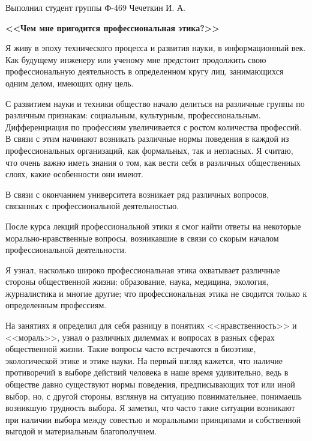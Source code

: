\documentclass[14pt,pscyr]{hedwork}
\begin{document}
  \onehalfspacing

  \begin{flushright}
    Выполнил студент группы Ф-469 Чечеткин И. А.
  \end{flushright}
  \vspace{-2em}
  \begin{center}
    \bfseries <<Чем мне пригодится профессиональная этика?>>
  \end{center}
  
  Я живу в эпоху технического процесса и развития науки, в информационный век.
  Как будущему инженеру или ученому мне предстоит продолжить свою
  профессиональную деятельность в определенном кругу лиц, занимающихся одним
  делом, имеющих одну цель.
  
  С развитием науки и техники общество начало делиться на различные группы по
  различным признакам: социальным, культурным, профессиональным. Дифференциация
  по профессиям увеличивается с ростом количества профессий. В связи с этим
  начинают возникать различные нормы поведения в каждой из профессиональных
  организаций, как формальных, так и негласных. Я считаю, что очень важно иметь
  знания о том, как вести себя в различных общественных слоях, какие
  особенности они имеют.
  
  В связи с окончанием университета возникает ряд различных вопросов, связанных
  с профессиональной деятельностью.
  
  После курса лекций профессиональной этики я смог найти ответы на некоторые
  морально-нравственные вопросы, возникавшие в связи со скорым началом
  профессиональной деятельности.
  
  Я узнал, насколько широко профессиональная этика охватывает различные стороны
  общественной жизни: образование, наука, медицина, экология, журналистика и
  многие другие; что профессиональная этика не сводится только к определенным
  профессиям.
  
  На занятиях я определил для себя разницу в понятиях <<нравственность>> и
  <<мораль>>, узнал о различных дилеммах и вопросах в разных сферах
  общественной жизни. Такие вопросы часто встречаются в биоэтике, экологической
  этике и этике науки. На первый взгляд кажется, что наличие противоречий в
  выборе действий человека в наше время удивительно, ведь в обществе давно
  существуют нормы поведения, предписывающих тот или иной выбор, но, с другой
  стороны, взглянув на ситуацию повнимательнее, понимаешь возникшую трудность
  выбора. Я заметил, что часто такие ситуации возникают при наличии выбора
  между совестью и моральными принципами и собственной выгодой и материальным
  благополучием.
  
\end{document}

